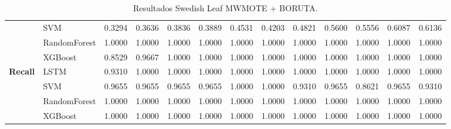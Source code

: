 \begin{table}[h]
\begin{adjustbox}{max width=15cm}
\begin{tabular}{|c|l|r|r|r|r|r|r|r|r|r|r|r|}
			& SVM &  0.3294 &  0.3636 &  0.3836 &  0.3889 &  0.4531 &  0.4203 &  0.4821 &  0.5600 &  0.5556 &  0.6087 &  0.6136 \\
			& RandomForest &  1.0000 &  1.0000 &  1.0000 &  1.0000 &  1.0000 &  1.0000 &  1.0000 &  1.0000 &  1.0000 &  1.0000 &  1.0000 \\
			& XGBoost &  0.8529 &  0.9667 &  1.0000 &  1.0000 &  1.0000 &  1.0000 &  1.0000 &  1.0000 &  1.0000 &  1.0000 &  1.0000 \\
			\hline
			\textbf{Recall} & LSTM &  0.9310 &  1.0000 &  1.0000 &  1.0000 &  1.0000 &  1.0000 &  1.0000 &  1.0000 &  1.0000 &  1.0000 &  1.0000 \\
			& SVM &  0.9655 &  0.9655 &  0.9655 &  0.9655 &  1.0000 &  1.0000 &  0.9310 &  0.9655 &  0.8621 &  0.9655 &  0.9310 \\
			& RandomForest &  1.0000 &  1.0000 &  1.0000 &  1.0000 &  1.0000 &  1.0000 &  1.0000 &  1.0000 &  1.0000 &  1.0000 &  1.0000 \\
			& XGBoost &  1.0000 &  1.0000 &  1.0000 &  1.0000 &  1.0000 &  1.0000 &  1.0000 &  1.0000 &  1.0000 &  1.0000 &  1.0000 \\
			\hline
		\end{tabular}
	\end{adjustbox}
	\caption{Resultados Swedish Leaf MWMOTE + BORUTA.}
	\label{tab:SLeaf_MWMOTE_BORUTA}
\end{table}

\newpage
